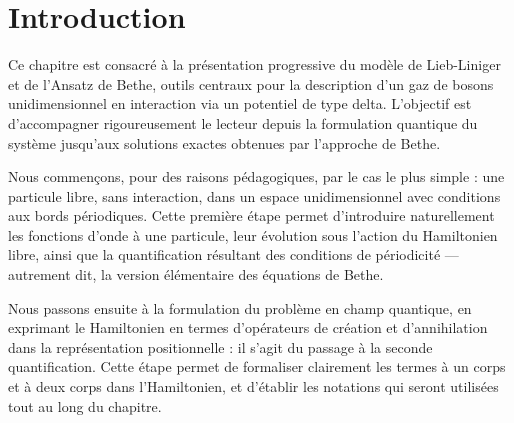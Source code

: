 %
%
%
%

\section*{Introduction}

Ce chapitre est consacré à la présentation progressive du modèle de Lieb-Liniger et de l’Ansatz de Bethe, outils centraux pour la description d’un gaz de bosons unidimensionnel en interaction via un potentiel de type delta. L’objectif est d’accompagner rigoureusement le lecteur depuis la formulation quantique du système jusqu’aux solutions exactes obtenues par l’approche de Bethe.

\medskip

Nous commençons, pour des raisons pédagogiques, par le cas le plus simple : une particule libre, sans interaction, dans un espace unidimensionnel avec conditions aux bords périodiques. Cette première étape permet d’introduire naturellement les fonctions d’onde à une particule, leur évolution sous l’action du Hamiltonien libre, ainsi que la quantification résultant des conditions de périodicité — autrement dit, la version élémentaire des équations de Bethe.

\medskip

Nous passons ensuite à la formulation du problème en champ quantique, en exprimant le Hamiltonien en termes d’opérateurs de création et d’annihilation dans la représentation positionnelle : il s’agit du passage à la seconde quantification. Cette étape permet de formaliser clairement les termes à un corps et à deux corps dans l’Hamiltonien, et d’établir les notations qui seront utilisées tout au long du chapitre.

